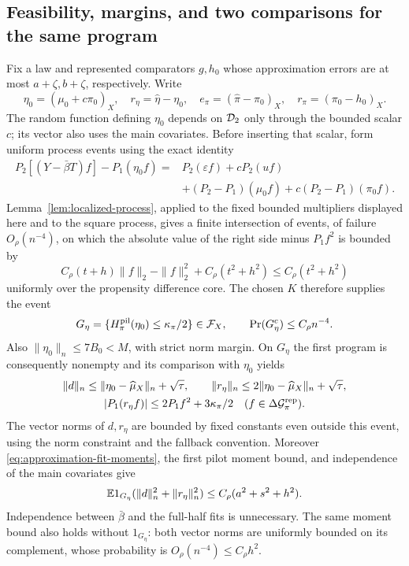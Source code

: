 \subsection{Feasibility, margins, and two comparisons for the same program}
\label{app:approximation-feasibility}

Fix a law and represented comparators $g,h_0$ whose approximation
errors are at most $a+\zeta,b+\zeta$, respectively. Write
\[
 \eta_0=(\mu_0+c\pi_0)_X,\quad
 r_\eta=\widehat\eta-\eta_0,\quad
 e_\pi=(\widehat\pi-\pi_0)_X,\quad
 r_\pi=(\pi_0-h_0)_X.
\]
The random function defining $\eta_0$ depends on $\mathcal D_2$ only
through the bounded scalar $c$; its vector also uses the main covariates.
Before inserting that scalar,
form uniform process events using the exact identity
\begin{equation}
 \begin{split}
 P_2[(Y-\bar\beta T)f]-P_1(\eta_0f)
 ={}&P_2(\varepsilon f)+cP_2(uf)\\
 &+(P_2-P_1)(\mu_0f)+c(P_2-P_1)(\pi_0f).
 \end{split}
 \label{eq:approximation-eta-identity}
\end{equation}
Lemma~\ref{lem:localized-process}, applied to the fixed bounded
multipliers displayed here and to the square process, gives a finite
intersection of events, of failure $O_\rho(n^{-4})$, on which the
absolute value of the right side minus $P_1f^2$ is bounded by
\[
 C_\rho(t+h)\|f\|_2-\|f\|_2^2+C_\rho(t^2+h^2)
 \le C_\rho(t^2+h^2)
\]
uniformly over the propensity difference core. The chosen $K$ therefore
supplies the event
\begin{equation}
 G_\eta=\{H^{\rm pil}_\pi(\eta_0)\le\kappa_\pi/2\}
 \in\mathcal F_X,\qquad
 \Pr(G_\eta^c)\le C_\rho n^{-4}.
 \label{eq:approximation-eta-event}
\end{equation}
Also $\|\eta_0\|_n\le7B_0<M$, with strict norm margin.
On $G_\eta$ the first program is consequently nonempty and its
comparison with $\eta_0$ yields
\begin{equation}
 \begin{gathered}
 \|d\|_n\le\|\eta_0-\widehat\mu_X\|_n+\sqrt\tau,\qquad
 \|r_\eta\|_n\le2\|\eta_0-\widehat\mu_X\|_n+\sqrt\tau,\\
 |P_1(r_\eta f)|\le2P_1f^2+3\kappa_\pi/2
 \quad(f\in\Delta\mathcal G_\pi^{\rm rep}).
 \end{gathered}
 \label{eq:approximation-eta-comparison}
\end{equation}
The vector norms of $d,r_\eta$ are bounded by fixed constants even
outside this event, using the norm constraint and the fallback
convention. Moreover \eqref{eq:approximation-fit-moments}, the first
pilot moment bound, and independence of the main covariates give
\begin{equation}
 \mathbb E1_{G_\eta}(\|d\|_n^2+\|r_\eta\|_n^2)
 \le C_\rho(a^2+s^2+h^2).
 \label{eq:approximation-eta-moments}
\end{equation}
Independence between $\bar\beta$ and the full-half fits is unnecessary.
The same moment bound also holds without $1_{G_\eta}$: both vector
norms are uniformly bounded on its complement, whose probability is
$O_\rho(n^{-4})\le C_\rho h^2$.

